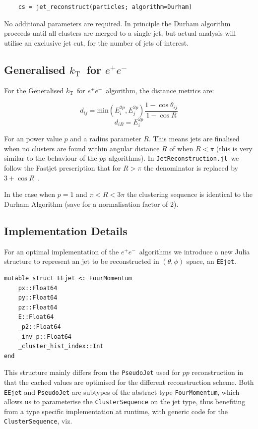 \documentclass{webofc}
\newcommand{\kt}{${k}_\text{T}$}
\newcommand{\JR}{\texttt{JetReconstruction.jl}}
\newcommand{\ee}{$e^+e^-$}
\begin{document}
\begin{verbatim}
    cs = jet_reconstruct(particles; algorithm=Durham)
\end{verbatim}

No additional parameters are required. In principle the Durham algorithm
proceeds until all clusters are merged to a single jet, but actual analysis will
utilise an exclusive jet cut, for the number of jets of interest.

\subsection{Generalised \kt\ for \ee}
\label{sec:getktee}

For the Generalised \kt\ for \ee\ algorithm, the distance metrics are:

$$
d_{ij} = \text{min}(E_i^{2p}, E_j^{2p}) \frac{1 - \cos \theta_{ij}}{1 - \cos R}
$$
$$
d_{iB} = E_i^{2p}
$$

For an power value $p$ and a radius parameter $R$. This means jets are finalised
when no clusters are found within angular distance $R$ of when $R<\pi$ (this is
very similar to the behaviour of the $pp$ algorithms). In \JR\ we follow the
Fastjet prescription that for $R>\pi$ the denominator is replaced by $3+\cos
R$~\cite{fastjetmanual}.

In the case when $p=1$ and $\pi < R < 3\pi$ the clustering sequence is identical
to the Durham Algorithm (save for a normalisation factor of 2).

\subsection{Implementation Details}
\label{eeimplementation}

For an optimal implementation of the \ee\ algorithms we introduce a new Julia
structure to represent an jet to be reconstructed in $(\theta, \phi)$ space, an \texttt{EEjet}.

\begin{verbatim}
mutable struct EEjet <: FourMomentum
    px::Float64
    py::Float64
    pz::Float64
    E::Float64
    _p2::Float64
    _inv_p::Float64
    _cluster_hist_index::Int
end
\end{verbatim}

This structure mainly differs from the \texttt{PseudoJet} used for $pp$
reconstruction in that the cached values are optimised for the different
reconstruction scheme. Both \texttt{EEjet} and \texttt{PseudoJet} are subtypes
of the abstract type \texttt{FourMomentum}, which allows us to parameterise the
\texttt{ClusterSequence} on the jet type, thus benefiting from a type specific
implementation at runtime, with generic code for the \texttt{ClusterSequence}, viz.
\end{document}
